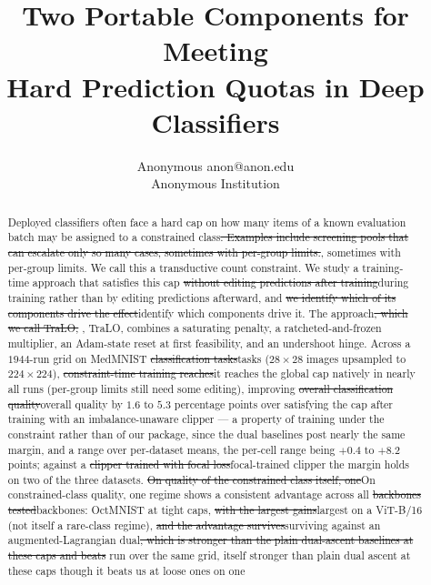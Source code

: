 \documentclass[10pt]{article}
\title{Two Portable Components for Meeting\\
Hard Prediction Quotas in Deep Classifiers}
\author{\name Anonymous \email anon@anon.edu \\
      \addr Anonymous Institution}
\newcommand{\del}[1]{{\color{red}\sout{#1}}}
\begin{document}
\maketitle

\begin{abstract}
Deployed classifiers often face a hard cap on how many items of a known
evaluation batch may be assigned to a constrained class\del{. Examples include
screening pools that can escalate only so many cases, sometimes with
per-group limits.}{\color{blue}, sometimes with per-group limits.} We call this a transductive count constraint. We study
a training-time approach that satisfies this cap \del{without editing
predictions after training}{\color{blue}during training rather than by editing
predictions afterward}, and \del{we identify which of its components
drive the effect}{\color{blue}identify which components drive it}. The approach\del{, which we call TraLO,}%
{\color{blue}, TraLO,} combines a
saturating penalty, a ratcheted-and-frozen multiplier, an Adam-state
reset at first feasibility, and an undershoot hinge. Across a $1944$-run
grid on MedMNIST \del{classification tasks}{\color{blue}tasks} ($28{\times}28$ images upsampled to
$224{\times}224$), \del{constraint-time training reaches}{\color{blue}it reaches} the {\color{blue}global} cap natively in
nearly all runs{\color{blue} (per-group limits still need some editing)}, improving \del{overall classification quality}{\color{blue}overall quality} by $1.6$ to
$5.3$ percentage points over satisfying the cap after training
{\color{blue}with an imbalance-unaware clipper --- a property of training under
the constraint rather than of our package, since the dual baselines post nearly
the same margin, and a range over per-dataset means, the per-cell range being
$+0.4$ to $+8.2$ points; against a \del{clipper trained with
focal loss}{focal-trained clipper} the margin holds on two of the three datasets}. \del{On
quality of the constrained class itself, one}{\color{blue}On constrained-class quality, one} regime shows a consistent
advantage across all \del{backbones tested}{\color{blue}backbones}: OctMNIST at tight caps, \del{with the
largest gains}{\color{blue}largest} on a ViT{\color{blue}-B/16} (not itself a rare-class regime){\color{blue}, \del{and the
advantage survives}{surviving} against an augmented-Lagrangian dual\del{, which is stronger than
the plain dual-ascent baselines at these caps and beats}{ run over the same grid,
itself stronger than
plain dual ascent at these caps though it beats} us at loose ones on one
}
\end{abstract}
\end{document}
